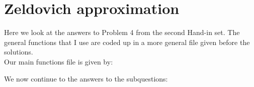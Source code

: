 \section{Zeldovich approximation}

Here we look at the answers to Problem 4 from the second Hand-in set. The general functions that I use are coded up in a more general file given before the solutions.\\


Our main functions file is given by:


We now continue to the answers to the subquestions:






